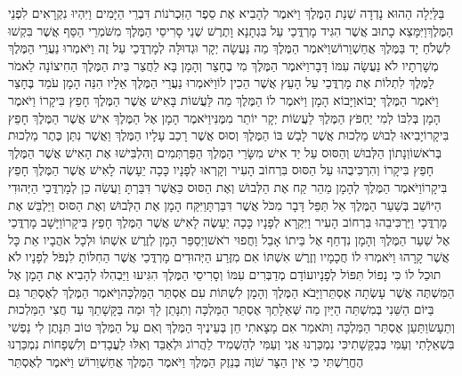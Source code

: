 \documentclass[../main/main.tex]{subfiles}
\begin{document}
\begin{multicols*}{\ncols}
בַּלַּיְלָה הַהוּא נָדְדָה שְׁנַת הַמֶּלֶךְ וַיֹּאמֶר לְהָבִיא אֶת סֵפֶר הַזִּכְרֹנוֹת דִּבְרֵי הַיָּמִים וַיִּהְיוּ נִקְרָאִים לִפְנֵי הַמֶּלֶךְ\PreVerseSpace{}וַיִּמָּצֵא כָתוּב אֲשֶׁר הִגִּיד מָרְדֳּכַי עַל בִּגְתָנָא וָתֶרֶשׁ שְׁנֵי סָרִיסֵי הַמֶּלֶךְ מִשֹּׁמְרֵי הַסַּף אֲשֶׁר בִּקְשׁוּ לִשְׁלֹחַ יָד בַּמֶּלֶךְ אֲחַשְׁוֵרוֹשׁ\PreVerseSpace{}וַיֹּאמֶר הַמֶּלֶךְ מַה נַּעֲשָׂה יְקָר וּגְדוּלָּה לְמָרְדֳּכַי עַל זֶה וַיֹּאמְרוּ נַעֲרֵי הַמֶּלֶךְ מְשָׁרְתָיו לֹא נַעֲשָׂה עִמּוֹ דָּבָר\PreVerseSpace{}וַיֹּאמֶר הַמֶּלֶךְ מִי בֶחָצֵר וְהָמָן בָּא לַחֲצַר בֵּית הַמֶּלֶךְ הַחִיצוֹנָה לֵאמֹר לַמֶּלֶךְ לִתְלוֹת אֶת מָרְדֳּכַי עַל הָעֵץ אֲשֶׁר הֵכִין לוֹ\PreVerseSpace{}וַיֹּאמְרוּ נַעֲרֵי הַמֶּלֶךְ אֵלָיו הִנֵּה הָמָן עֹמֵד בֶּחָצֵר וַיֹּאמֶר הַמֶּלֶךְ יָבוֹא\PreVerseSpace{}וַיָּבוֹא הָמָן וַיֹּאמֶר לוֹ הַמֶּלֶךְ מַה לַּעֲשׁוֹת בָּאִישׁ אֲשֶׁר הַמֶּלֶךְ חָפֵץ בִּיקָרוֹ וַיֹּאמֶר הָמָן בְּלִבּוֹ לְמִי יַחְפֹּץ הַמֶּלֶךְ לַעֲשׂוֹת יְקָר יוֹתֵר מִמֶּנִּי\PreVerseSpace{}וַיֹּאמֶר הָמָן אֶל הַמֶּלֶךְ אִישׁ אֲשֶׁר הַמֶּלֶךְ חָפֵץ בִּיקָרוֹ\PreVerseSpace{}יָבִיאוּ לְבוּשׁ מַלְכוּת אֲשֶׁר לָבַשׁ בּוֹ הַמֶּלֶךְ וְסוּס אֲשֶׁר רָכַב עָלָיו הַמֶּלֶךְ וַאֲשֶׁר נִתַּן כֶּתֶר מַלְכוּת בְּרֹאשׁוֹ\PreVerseSpace{}וְנָתוֹן הַלְּבוּשׁ וְהַסּוּס עַל יַד אִישׁ מִשָּׂרֵי הַמֶּלֶךְ הַפַּרְתְּמִים וְהִלְבִּישׁוּ אֶת הָאִישׁ אֲשֶׁר הַמֶּלֶךְ חָפֵץ בִּיקָרוֹ וְהִרְכִּיבֻהוּ עַל הַסּוּס בִּרְחוֹב הָעִיר וְקָרְאוּ לְפָנָיו כָּכָה יֵעָשֶׂה לָאִישׁ אֲשֶׁר הַמֶּלֶךְ חָפֵץ בִּיקָרוֹ\PreVerseSpace{}וַיֹּאמֶר הַמֶּלֶךְ לְהָמָן מַהֵר קַח אֶת הַלְּבוּשׁ וְאֶת הַסּוּס כַּאֲשֶׁר דִּבַּרְתָּ וַעֲשֵׂה כֵן לְמָרְדֳּכַי הַיְּהוּדִי הַיּוֹשֵׁב בְּשַׁעַר הַמֶּלֶךְ אַל תַּפֵּל דָּבָר מִכֹּל אֲשֶׁר דִּבַּרְתָּ\PreVerseSpace{}וַיִּקַּח הָמָן אֶת הַלְּבוּשׁ וְאֶת הַסּוּס וַיַּלְבֵּשׁ אֶת מָרְדֳּכָי וַיַּרְכִּיבֵהוּ בִּרְחוֹב הָעִיר וַיִּקְרָא לְפָנָיו כָּכָה יֵעָשֶׂה לָאִישׁ אֲשֶׁר הַמֶּלֶךְ חָפֵץ בִּיקָרוֹ\PreVerseSpace{}וַיָּשָׁב מָרְדֳּכַי אֶל שַׁעַר הַמֶּלֶךְ וְהָמָן נִדְחַף אֶל בֵּיתוֹ אָבֵל וַחֲפוּי רֹאשׁ\PreVerseSpace{}וַיְסַפֵּר הָמָן לְזֶרֶשׁ אִשְׁתּוֹ וּלְכָל אֹהֲבָיו אֵת כָּל אֲשֶׁר קָרָהוּ וַיֹּאמְרוּ לוֹ חֲכָמָיו וְזֶרֶשׁ אִשְׁתּוֹ אִם מִזֶּרַע הַיְּהוּדִים מָרְדֳּכַי אֲשֶׁר הַחִלּוֹתָ לִנְפֹּל לְפָנָיו לֹא תוּכַל לוֹ כִּי נָפוֹל תִּפּוֹל לְפָנָיו\PreVerseSpace{}עוֹדָם מְדַבְּרִים עִמּוֹ וְסָרִיסֵי הַמֶּלֶךְ הִגִּיעוּ וַיַּבְהִלוּ לְהָבִיא אֶת הָמָן אֶל הַמִּשְׁתֶּה אֲשֶׁר עָשְׂתָה אֶסְתֵּר\PreChapterSpace{}וַיָּבֹא הַמֶּלֶךְ וְהָמָן לִשְׁתּוֹת עִם אֶסְתֵּר הַמַּלְכָּה\PreVerseSpace{}וַיֹּאמֶר הַמֶּלֶךְ לְאֶסְתֵּר גַּם בַּיּוֹם הַשֵּׁנִי בְּמִשְׁתֵּה הַיַּיִן מַה שְּׁאֵלָתֵךְ אֶסְתֵּר הַמַּלְכָּה וְתִנָּתֵן לָךְ וּמַה בַּקָּשָׁתֵךְ עַד חֲצִי הַמַּלְכוּת וְתֵעָשׂ\PreVerseSpace{}וַתַּעַן אֶסְתֵּר הַמַּלְכָּה וַתֹּאמַר אִם מָצָאתִי חֵן בְּעֵינֶיךָ הַמֶּלֶךְ וְאִם עַל הַמֶּלֶךְ טוֹב תִּנָּתֶן לִי נַפְשִׁי בִּשְׁאֵלָתִי וְעַמִּי בְּבַקָּשָׁתִי\PreVerseSpace{}כִּי נִמְכַּרְנוּ אֲנִי וְעַמִּי לְהַשְׁמִיד לַהֲרוֹג וּלְאַבֵּד וְאִלּוּ לַעֲבָדִים וְלִשְׁפָחוֹת נִמְכַּרְנוּ הֶחֱרַשְׁתִּי כִּי אֵין הַצָּר שֹׁוֶה בְּנֵזֶק הַמֶּלֶךְ \ClosedSection{}וַיֹּאמֶר הַמֶּלֶךְ אֲחַשְׁוֵרוֹשׁ וַיֹּאמֶר לְאֶסְתֵּר 
\end{multicols*}
\end{document}
